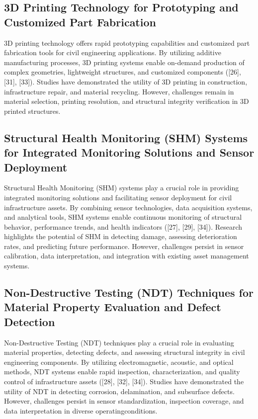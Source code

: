 \documentclass[journal, a4paper]{IEEEtran}
\begin{document}
\subsection{3D Printing Technology for Prototyping and Customized Part Fabrication}
3D printing technology offers rapid prototyping capabilities and customized part fabrication tools for civil
engineering applications. By utilizing additive manufacturing processes, 3D printing systems enable on-demand
production of complex geometries, lightweight structures, and customized components ([26], [31], [33]). Studies
have demonstrated the utility of 3D printing in construction, infrastructure repair, and material recycling.
However, challenges remain in material selection, printing resolution, and structural integrity verification in
3D printed structures. 

\subsection{Structural Health Monitoring (SHM) Systems for Integrated Monitoring Solutions and Sensor Deployment}
Structural Health Monitoring (SHM) systems play a crucial role in providing integrated monitoring solutions and
facilitating sensor deployment for civil infrastructure assets. By combining sensor technologies, data acquisition
systems, and analytical tools, SHM systems enable continuous monitoring of structural behavior, performance trends,
and health indicators ([27], [29], [34]). Research highlights the potential of SHM in detecting damage, assessing
deterioration rates, and predicting future performance. However, challenges persist in sensor calibration, data
interpretation, and integration with existing asset management systems.



\subsection{Non-Destructive Testing (NDT) Techniques for Material Property Evaluation and Defect Detection}
Non-Destructive Testing (NDT) techniques play a crucial role in evaluating material properties, detecting defects,
and assessing structural integrity in civil engineering components. By utilizing electromagnetic, acoustic, and
optical methods, NDT systems enable rapid inspection, characterization, and quality control of infrastructure assets
([28], [32], [34]). Studies have demonstrated the utility of NDT in detecting corrosion, delamination, and subsurface defects.
However, challenges persist in sensor standardization, inspection coverage,
and data interpretation in diverse operatingconditions.
\end{document}

